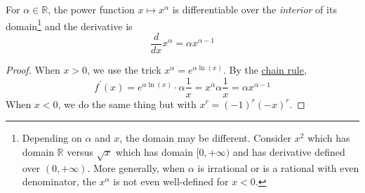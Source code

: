   \begin{theorem}
    \label{thm:power}
    For $\alpha \in \mathbb{R}$, the power function $x \mapsto x^\alpha$ is differentiable over the \textit{interior} of its domain\footnote{Depending on $\alpha$ and $x$, the domain may be different. Consider $x^2$ which has domain $\mathbb{R}$ versus $\sqrt{x}$ which has domain $[0, +\infty)$ and has derivative defined over $(0, +\infty)$. More generally, when $\alpha$ is irrational or is a rational with even denominator, the $x^\alpha$ is not even well-defined for $x < 0$.} and the derivative is 
    \begin{equation}
      \frac{d}{dx} x^\alpha = \alpha x^{\alpha - 1} 
    \end{equation}
  \end{theorem}
  \begin{proof}
    When $x > 0$, we use the trick $x^\alpha = e^{\alpha \ln(x)}$. By the \hyperref[thm:chain]{chain rule}, 
    \begin{equation}
      f^\prime (x) = e^{\alpha \ln(x)} \cdot \alpha \frac{1}{x} = x^\alpha \alpha \frac{1}{x} = \alpha x^{\alpha - 1}
    \end{equation}
    When $x < 0$, we do the same thing but with $x^r = (-1)^r (-x)^r$. 
  \end{proof}

